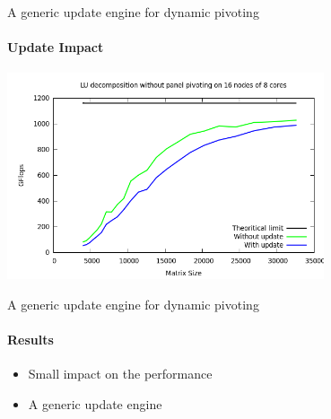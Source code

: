 \begin{frame}{A generic update engine for dynamic pivoting}
\framesubtitle{Update Impact}
\begin{center}
\includegraphics[width=0.7\textwidth]{dgetrf_update_problem.png} 
\end{center}
\end{frame}

\begin{frame}{A generic update engine for dynamic pivoting}
\framesubtitle{Results}
\begin{itemize}
\item Small impact on the performance
\item A generic update engine
\end{itemize}
\end{frame}